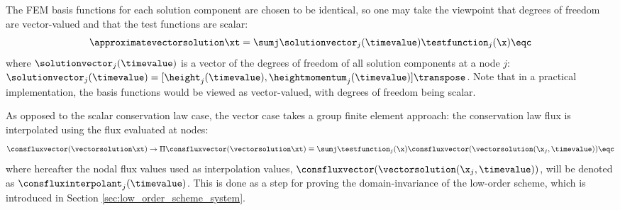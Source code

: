 The FEM basis functions for each solution component are chosen to be identical,
so one may take the viewpoint that degrees of freedom are vector-valued
and that the test functions are scalar:
\begin{equation}
  \approximatevectorsolution\xt = \sumj \solutionvector_j(\timevalue)
  \testfunction_j(\x) \eqc
\end{equation}
where $\solutionvector_j(\timevalue)$ is a vector of the degrees of freedom of all
solution components at a node $j$:
$\solutionvector_j(\timevalue)=[\height_j(\timevalue),
\heightmomentum_j(\timevalue)]\transpose$. Note that in a practical
implementation, the basis functions would be viewed as vector-valued, with
degrees of freedom being scalar.

As opposed to the scalar conservation law case, the vector case takes a
group finite element approach: the conservation law flux is interpolated
using the flux evaluated at nodes:
\begin{equation}
  \consfluxvector(\vectorsolution\xt) \rightarrow
  \Pi\consfluxvector(\vectorsolution\xt) 
    \equiv \sumj\testfunction_j(\x)\consfluxvector
      (\vectorsolution(\x_j,\timevalue))
  \eqc
\end{equation}
where hereafter the nodal flux values used as interpolation values,
$\consfluxvector(\vectorsolution(\x_j,\timevalue))$,
will be denoted as $\consfluxinterpolant_j(\timevalue)$. This is done
as a step for proving the domain-invariance of the low-order scheme,
which is introduced in Section \ref{sec:low_order_scheme_system}.

